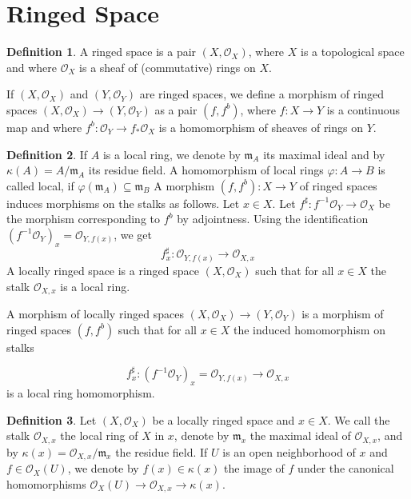 \documentclass[12pt,a4paper]{book}
\theoremstyle{definition}
\newtheorem{defn}{Definition}[section]
\begin{document}
\section{Ringed Space} 
\begin{defn}
    A ringed space is a pair $\left(X, \mathscr{O}_X\right)$, where $X$ is a topological space and where $\mathscr{O}_X$ is a sheaf of (commutative) rings on $X$.

    If $\left(X, \mathscr{O}_X\right)$ and $\left(Y, \mathscr{O}_Y\right)$ are ringed spaces, we define a morphism of ringed spaces $\left(X, \mathscr{O}_X\right) \rightarrow\left(Y, \mathscr{O}_Y\right)$ as a pair $\left(f, f^b\right)$, where $f: X \rightarrow Y$ is a continuous map and where $f^b: \mathscr{O}_Y \rightarrow f_* \mathscr{O}_X$ is a homomorphism of sheaves of rings on $Y$.

\end{defn}
\begin{defn}
    If $A$ is a local ring, we denote by $\mathfrak{m}_A$ its maximal ideal and by $\kappa(A)=A / \mathfrak{m}_A$ its residue field. A homomorphism of local rings $\varphi: A \rightarrow B$ is called local, if $\varphi\left(\mathfrak{m}_A\right) \subseteq \mathfrak{m}_B$
    A morphism $\left(f, f^b\right): X \rightarrow Y$ of ringed spaces induces morphisms on the stalks as follows. Let $x \in X$. 
    Let $f^{\sharp}: f^{-1} \mathscr{O}_Y \rightarrow \mathscr{O}_X$ be the morphism corresponding to $f^b$ by adjointness. Using the identification $\left(f^{-1} \mathscr{O}_Y\right)_x=\mathscr{O}_{Y, f(x)}$, we get
    $$
    f_x^{\sharp}: \mathscr{O}_{Y, f(x)} \rightarrow \mathscr{O}_{X, x}
    $$
    A locally ringed space is a ringed space $\left(X, \mathscr{O}_X\right)$ such that for all $x \in X$ the stalk $\mathscr{O}_{X, x}$ is a local ring.
    
    A morphism of locally ringed spaces $\left(X, \mathscr{O}_X\right) \rightarrow\left(Y, \mathscr{O}_Y\right)$ is a morphism of ringed spaces $\left(f, f^b\right)$ such that for all $x \in X$ the induced homomorphism on stalks
    
    $$
    f_x^{\sharp}:\left(f^{-1} \mathscr{O}_Y\right)_x=\mathscr{O}_{Y, f(x)} \rightarrow \mathscr{O}_{X, x}
    $$
    is a local ring homomorphism.
\end{defn}
\begin{defn}
    Let $\left(X, \mathscr{O}_X\right)$ be a locally ringed space and $x \in X$. We call the stalk $\mathscr{O}_{X, x}$ the local ring of $X$ in $x$, denote by $\mathfrak{m}_x$ the maximal ideal of $\mathscr{O}_{X, x}$, and by $\kappa(x)=\mathscr{O}_{X, x} / \mathfrak{m}_x$ the residue field. If $U$ is an open neighborhood of $x$ and $f \in \mathscr{O}_X(U)$, we denote by $f(x) \in \kappa(x)$ the image of $f$ under the canonical homomorphisms $\mathscr{O}_X(U) \rightarrow \mathscr{O}_{X, x} \rightarrow \kappa(x)$.
\end{defn}
\end{document}
